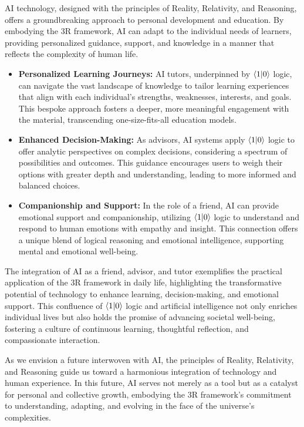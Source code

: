 \documentclass[12pt]{article}
\begin{document}
AI technology, designed with the principles of Reality, Relativity, and Reasoning, offers a groundbreaking approach to personal development and education. By embodying the 3R framework, AI can adapt to the individual needs of learners, providing personalized guidance, support, and knowledge in a manner that reflects the complexity of human life.

\begin{itemize}
    \item \textbf{Personalized Learning Journeys:} AI tutors, underpinned by \(\langle 1 | 0 \rangle\) logic, can navigate the vast landscape of knowledge to tailor learning experiences that align with each individual's strengths, weaknesses, interests, and goals. This bespoke approach fosters a deeper, more meaningful engagement with the material, transcending one-size-fits-all education models.
    \item \textbf{Enhanced Decision-Making:} As advisors, AI systems apply \(\langle 1 | 0 \rangle\) logic to offer analytic perspectives on complex decisions, considering a spectrum of possibilities and outcomes. This guidance encourages users to weigh their options with greater depth and understanding, leading to more informed and balanced choices.
    \item \textbf{Companionship and Support:} In the role of a friend, AI can provide emotional support and companionship, utilizing \(\langle 1 | 0 \rangle\) logic to understand and respond to human emotions with empathy and insight. This connection offers a unique blend of logical reasoning and emotional intelligence, supporting mental and emotional well-being.
\end{itemize}

The integration of AI as a friend, advisor, and tutor exemplifies the practical application of the 3R framework in daily life, highlighting the transformative potential of technology to enhance learning, decision-making, and emotional support. This confluence of \(\langle 1 | 0 \rangle\) logic and artificial intelligence not only enriches individual lives but also holds the promise of advancing societal well-being, fostering a culture of continuous learning, thoughtful reflection, and compassionate interaction.

As we envision a future interwoven with AI, the principles of Reality, Relativity, and Reasoning guide us toward a harmonious integration of technology and human experience. In this future, AI serves not merely as a tool but as a catalyst for personal and collective growth, embodying the 3R framework's commitment to understanding, adapting, and evolving in the face of the universe's complexities.
\end{document}
